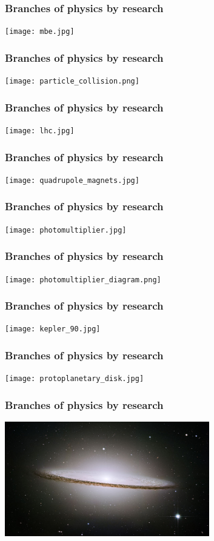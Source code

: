 \documentclass{beamer}
\begin{document}
\begin{frame}
  \center
  \frametitle{Branches of physics by research}
  \texttt{[image: mbe.jpg]}
\end{frame}

\begin{frame}
  \center
  \frametitle{Branches of physics by research}
  \texttt{[image: particle\_collision.png]}
\end{frame}

\begin{frame}
  \center
  \frametitle{Branches of physics by research}
  \texttt{[image: lhc.jpg]}
\end{frame}

\begin{frame}
  \center
  \frametitle{Branches of physics by research}
  \texttt{[image: quadrupole\_magnets.jpg]}
\end{frame}

\begin{frame}
  \center
  \frametitle{Branches of physics by research}
  \texttt{[image: photomultiplier.jpg]}
\end{frame}

\begin{frame}
  \center
  \frametitle{Branches of physics by research}
  \texttt{[image: photomultiplier\_diagram.png]}
\end{frame}

\begin{frame}
  \center
  \frametitle{Branches of physics by research}
  \texttt{[image: kepler\_90.jpg]}
\end{frame}

\begin{frame}
  \center
  \frametitle{Branches of physics by research}
  \texttt{[image: protoplanetary\_disk.jpg]}
\end{frame}

\begin{frame}
  \center
  \frametitle{Branches of physics by research}
  \includegraphics[height=5cm]{sombrero.jpg}
\end{frame}
\end{document}
